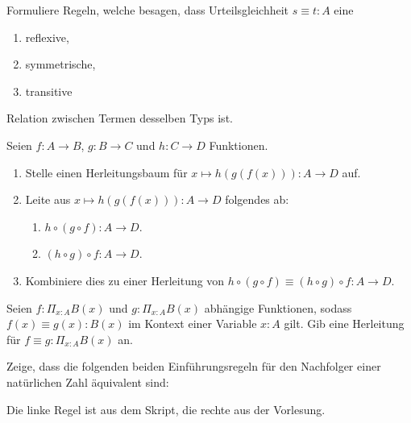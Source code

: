 \documentclass{uebung}
\begin{document}

\begin{exercise}
  Formuliere Regeln, welche besagen, dass Urteilsgleichheit $s\equiv t:A$ eine
  \begin{enumerate}
    \item reflexive,
    \item symmetrische,
    \item transitive
  \end{enumerate}
  Relation zwischen Termen desselben Typs ist.
\end{exercise}

\begin{exercise}
  Seien $f:A\to B$, $g:B\to C$ und $h:C\to D$ Funktionen.
  \begin{enumerate}
    \item Stelle einen Herleitungsbaum für $x\mapsto h(g(f(x))):A\to D$ auf.
    \item Leite aus $x\mapsto h(g(f(x))):A\to D$ folgendes ab:
      \begin{enumerate}
        \item $h\circ (g\circ f):A\to D$.
        \item $(h\circ g)\circ f:A\to D$.
      \end{enumerate}
    \item Kombiniere dies zu einer Herleitung von $h\circ(g\circ f)\equiv (h\circ g)\circ f:A\to D$.
  \end{enumerate}
\end{exercise}

\begin{exercise}
  Seien $f:\Pi_{x:A}B(x)$ und $g:\Pi_{x:A}B(x)$ abhängige Funktionen, sodass $f(x)\equiv g(x):B(x)$ im Kontext einer Variable $x:A$ gilt.
  Gib eine Herleitung für $f\equiv g:\Pi_{x:A}B(x)$ an.
\end{exercise}

\begin{exercise}
  Zeige, dass die folgenden beiden Einführungsregeln für den Nachfolger einer natürlichen Zahl äquivalent sind:
  {\tiny Die linke Regel ist aus dem Skript, die rechte aus der Vorlesung.}
\end{exercise}
\end{document}

